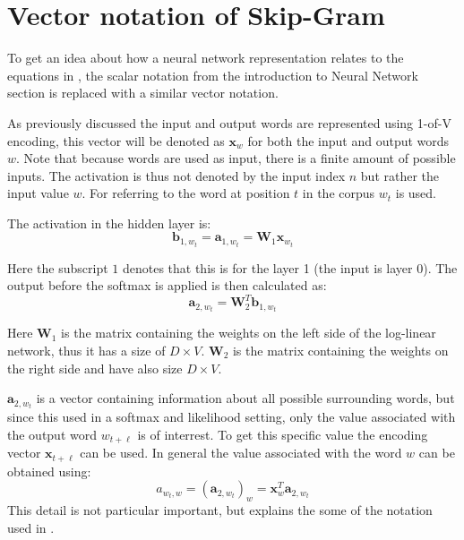 \chapter{Vector notation of Skip-Gram}
\label{appendix:skipgram}

To get an idea about how a neural network representation relates to the equations in \cite{word2vec-details}, the scalar notation from the introduction to Neural Network section is replaced with a similar vector notation.

As previously discussed the input and output words are represented using 1-of-V encoding, this vector will be denoted as $\mathbf{x}_w$ for both the input and output words $w$. Note that because words are used as input, there is a finite amount of possible inputs. The activation is thus not denoted by the input index $n$ but rather the input value $w$. For referring to the word at position $t$ in the corpus $w_t$ is used.

The activation in the hidden layer is:
\begin{equation}
\mathbf{b}_{1,w_t} = \mathbf{a}_{1,w_t} = \mathbf{W}_{1} \mathbf{x}_{w_t}
\end{equation}

Here the subscript $1$ denotes that this is for the layer 1 (the input is layer 0). The output before the softmax is applied is then calculated as:
\begin{equation}
\mathbf{a}_{2,w_t} = \mathbf{W}_2^T \mathbf{b}_{1,w_t}
\end{equation}

Here $\mathbf{W}_1$ is the matrix containing the weights on the left side of the log-linear network, thus it has a size of $D \times V$. $\mathbf{W}_2$ is the matrix containing the weights on the right side and have also size $D \times V$.

$\mathbf{a}_{2,w_t}$ is a vector containing information about all possible surrounding words, but since this used in a softmax and likelihood setting, only the value associated with the output word $w_{t + \ell}$ is of interrest. To get this specific value the encoding vector $\mathbf{x}_{t + \ell}$ can be used. In general the value associated with the word $w$ can be obtained using:
\begin{equation}
a_{w_t,w} = \left(\mathbf{a}_{2,w_t}\right)_w = \mathbf{x}_{w}^T \mathbf{a}_{2,w_t}
\end{equation}
This detail is not particular important, but explains the some of the notation used in \cite{word2vec-details}.

